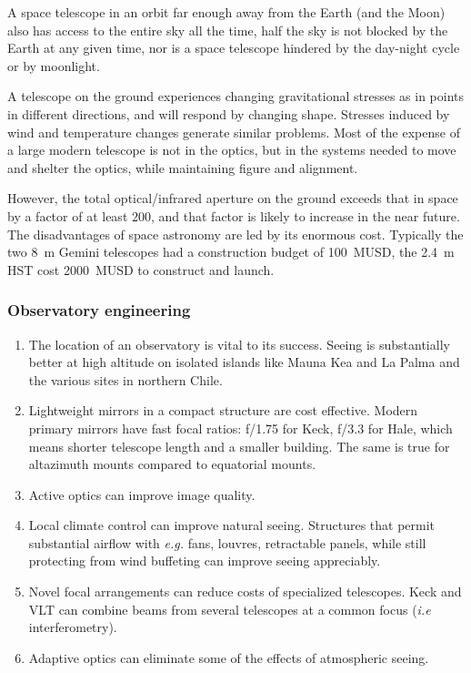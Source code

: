 A space telescope in an orbit far enough away from the Earth (and the Moon) also has access 
to the entire sky all the time, half the sky is not blocked by the Earth at any given time, 
nor is a space telescope hindered by the day-night cycle or by moonlight.

A telescope on the ground experiences changing gravitational stresses as in points in different
directions, and will respond by changing shape. Stresses induced by wind and temperature changes
generate similar problems. Most of the expense of a large modern telescope is not in the optics, 
but in the systems needed to move and shelter the optics, while maintaining figure and alignment.

However, the total optical/infrared aperture on the ground exceeds that in space by a factor of
at least 200, and that factor is likely to increase in the near future. The disadvantages of
space astronomy are led by its enormous cost. Typically the two 8~m Gemini telescopes had a 
construction budget of 100~MUSD, the 2.4~m HST cost 2000~MUSD to construct and launch.

\subsubsection{Observatory engineering}

\begin{enumerate}
\item The location of an observatory is vital to its success. Seeing is substantially better
at high altitude on isolated islands like Mauna Kea and La Palma and the various sites in 
northern Chile. 
\item Lightweight mirrors in a compact structure are cost effective. Modern primary mirrors
have fast focal ratios: f/1.75 for Keck, f/3.3 for Hale, which means shorter telescope length 
and a smaller building. The same is true for altazimuth mounts compared to equatorial mounts.
\item Active optics can improve image quality.
\item Local climate control can improve natural seeing. Structures that permit substantial
airflow with {\it e.g.} fans, louvres, retractable panels, while still protecting from 
wind buffeting can improve seeing appreciably.
\item Novel focal arrangements can reduce costs of specialized telescopes. Keck and VLT can 
combine beams from several telescopes at a common focus ({\it i.e} interferometry).
\item Adaptive optics can eliminate some of the effects of atmospheric seeing.
\end{enumerate}

